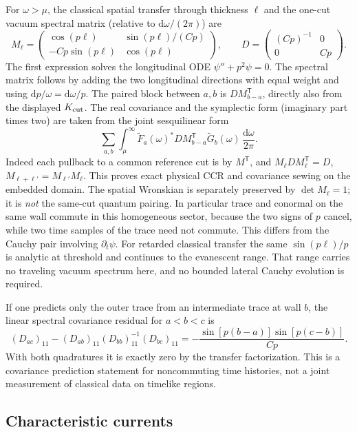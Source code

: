 \documentclass[11pt]{article}
\newcommand{\dd}{\mathrm d}
\newcommand{\T}{\mathsf T}
\begin{document}
For \(\omega>\mu\), the classical spatial transfer through thickness \(\ell\) and the one-cut vacuum spectral matrix (relative to \(\dd\omega/(2\pi)\)) are
\[
 M_\ell=\begin{pmatrix}
 \cos(p\ell)&\sin(p\ell)/(Cp)\\
 -Cp\sin(p\ell)&\cos(p\ell)
 \end{pmatrix},\qquad D=\begin{pmatrix}(Cp)^{-1}&0\\0&Cp\end{pmatrix}.
\]
The first expression solves the longitudinal ODE \(\psi''+p^2\psi=0\). The spectral matrix follows by adding the two longitudinal directions with equal weight and using \(\dd p/\omega=\dd\omega/p\). The paired block between \(a,b\) is \(D M_{b-a}^{\T}\), directly also from the displayed \(K_{\rm cut}\). The real covariance and the symplectic form (imaginary part times two) are taken from the joint sesquilinear form
\[
   \sum_{a,b}\int_\mu^\infty
       \widetilde F_a(\omega)^* D M_{b-a}^{\T}\widetilde G_b(\omega)
       \,\frac{\dd\omega}{2\pi}.
\]
Indeed each pullback to a common reference cut is by \(M^{\T}\), and \(M_\ell D M_\ell^{\T}=D\), \(M_{\ell+\ell'}=M_{\ell'}M_\ell\). This proves exact physical CCR and covariance sewing on the embedded domain. The spatial Wronskian is separately preserved by \(\det M_\ell=1\); it is \emph{not} the same-cut quantum pairing. In particular trace and conormal on the same wall commute in this homogeneous sector, because the two signs of \(p\) cancel, while two time samples of the trace need not commute. This differs from the Cauchy pair involving \(\partial_t\psi\). For retarded classical transfer the same \(\sin(p\ell)/p\) is analytic at threshold and continues to the evanescent range. That range carries no traveling vacuum spectrum here, and no bounded lateral Cauchy evolution is required.

If one predicts only the outer trace from an intermediate trace at wall \(b\), the linear spectral covariance residual for \(a<b<c\) is
\[
 (D_{ac})_{11}-(D_{ab})_{11}(D_{bb})_{11}^{-1}(D_{bc})_{11}
   =-\frac{\sin[p(b-a)]\sin[p(c-b)]}{Cp}.
\]
With both quadratures it is exactly zero by the transfer factorization. This is a covariance prediction statement for noncommuting time histories, not a joint measurement of classical data on timelike regions.

\subsection{Characteristic currents}
\end{document}

